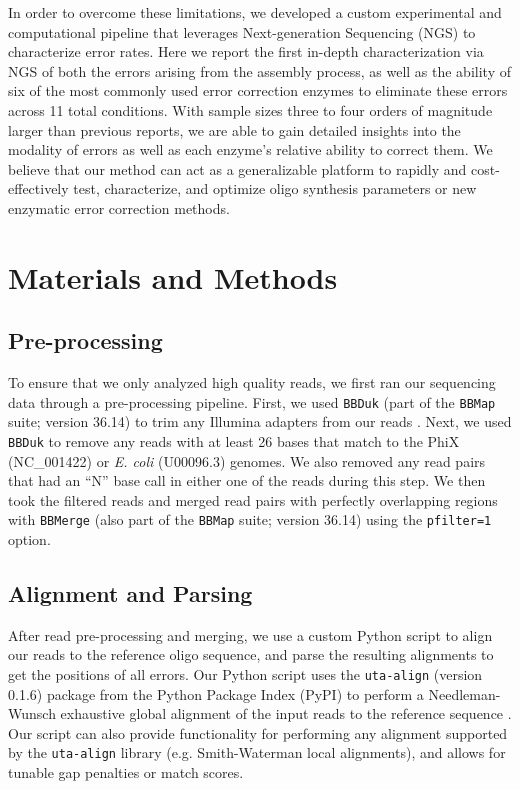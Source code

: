 \documentclass[letterpaper,12pt]{article}
\begin{document}
In order to overcome these limitations, we developed a custom experimental and computational pipeline that leverages Next-generation Sequencing (NGS) to characterize error rates. Here we report the first in-depth characterization via NGS of both the errors arising from the assembly process, as well as the ability of six of the most commonly used error correction enzymes to eliminate these errors across 11 total conditions. With sample sizes three to four orders of magnitude larger than previous reports, we are able to gain detailed insights into the modality of errors as well as each enzyme's relative ability to correct them. We believe that our method can act as a generalizable platform to rapidly and cost-effectively test, characterize, and optimize oligo synthesis parameters or new enzymatic error correction methods.

%
\section*{Materials and Methods}
%

\subsection*{Pre-processing}
To ensure that we only analyzed high quality reads, we first ran our sequencing data through a pre-processing pipeline. First, we used \texttt{BBDuk} (part of the \texttt{BBMap} suite; version 36.14) to trim any Illumina adapters from our reads \cite{bbmap}. Next, we used \texttt{BBDuk} to remove any reads with at least 26 bases that match to the PhiX (NC\_001422) or \textit{E. coli} (U00096.3) genomes. We also removed any read pairs that had an ``N'' base call in either one of the reads during this step. We then took the filtered reads and merged read pairs with perfectly overlapping regions with \texttt{BBMerge} (also part of the \texttt{BBMap} suite; version 36.14) using the \texttt{pfilter=1} option.

\subsection*{Alignment and Parsing}
After read pre-processing and merging, we use a custom Python script to align our reads to the reference oligo sequence, and parse the resulting alignments to get the positions of all errors. Our Python script uses the \texttt{uta-align} (version 0.1.6) package from the Python Package Index (PyPI) to perform a Needleman-Wunsch exhaustive global alignment of the input reads to the reference sequence \cite{uta-align}. Our script can also provide functionality for performing any alignment supported by the \texttt{uta-align} library (e.g. Smith-Waterman local alignments), and allows for tunable gap penalties or match scores.
\end{document}
